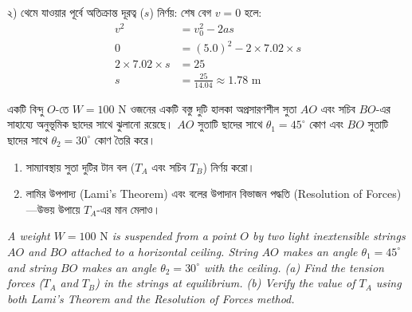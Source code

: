 \documentclass[12pt, a4paper]{article}
\begin{document}
\begin{tcolorbox}[solutionbox={সমাধান (Solution)}]
২) থেমে যাওয়ার পূর্বে অতিক্রান্ত দূরত্ব ($s$) নির্ণয়: শেষ বেগ $v = 0$ হলে:
\begin{align*}
    v^2 &= v_0^2 - 2 a s \\
    0 &= (5.0)^2 - 2 \times 7.02 \times s \\
    2 \times 7.02 \times s &= 25 \\
    s &= \frac{25}{14.04} \approx \mathbf{1.78}\text{ m}
\end{align*}
\end{tcolorbox}
\begin{tcolorbox}[questionbox={প্রশ্ন (Question)8}]
\noindent
একটি বিন্দু $O$-তে $W = 100\text{ N}$ ওজনের একটি বস্তু দুটি হালকা অপ্রসারণশীল সুতা $AO$ এবং সচিব $BO$-এর সাহায্যে অনুভূমিক ছাদের সাথে ঝুলানো রয়েছে। $AO$ সুতাটি ছাদের সাথে $\theta_1 = 45^\circ$ কোণ এবং $BO$ সুতাটি ছাদের সাথে $\theta_2 = 30^\circ$ কোণ তৈরি করে। 
\begin{enumerate}
    \item[(ক)] সাম্যাবস্থায় সুতা দুটির টান বল ($T_A$ এবং সচিব $T_B$) নির্ণয় করো।
    \item[(খ)] লামির উপপাদ্য (Lami's Theorem) এবং বলের উপাদান বিভাজন পদ্ধতি (Resolution of Forces)—উভয় উপায়ে $T_A$-এর মান মেলাও।
\end{enumerate}

\vspace{0.8em}
\begin{english}
\noindent\textit{\color{darkgray}
A weight $W = 100\text{ N}$ is suspended from a point $O$ by two light inextensible strings $AO$ and $BO$ attached to a horizontal ceiling. String $AO$ makes an angle $\theta_1 = 45^\circ$ and string $BO$ makes an angle $\theta_2 = 30^\circ$ with the ceiling. 
(a) Find the tension forces ($T_A$ and $T_B$) in the strings at equilibrium. 
(b) Verify the value of $T_A$ using both Lami's Theorem and the Resolution of Forces method.
}
\end{english}
\end{tcolorbox}
\end{document}
